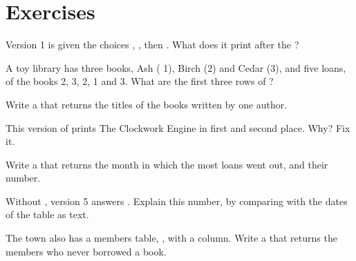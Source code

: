 \section{Exercises}

\begin{exercise}[$\star$]\label{exo:g8:project-data-explorer:1}
Version 1 is given the choices , , then . What does it
print after the ?
\end{exercise}

\begin{exercise}[$\star$]\label{exo:g8:project-data-explorer:2}
A toy library has three books, Ash ( 1), Birch (2) and Cedar
(3), and five loans, of the books 2, 3, 2, 1 and 3. What are the first three
rows of ?
\end{exercise}

\begin{exercise}[$\star$]\label{exo:g8:project-data-explorer:3}
Write a   that returns the titles of
the books written by one author.
\end{exercise}

\begin{exercise}[$\star$]\label{exo:g8:project-data-explorer:4}
This version of  prints The Clockwork Engine in first and second
place. Why? Fix it.

\label{lst:g8:project-data-explorer:top-bug}
\end{exercise}

\begin{exercise}[$\star\star$]\label{exo:g8:project-data-explorer:5}
Write a   that returns the month in which
the most loans went out, and their number.
\end{exercise}

\begin{exercise}[$\star\star$]\label{exo:g8:project-data-explorer:6}
Without , version 5 answers . Explain this number, by comparing  with the
dates of the table as text.
\end{exercise}

\begin{exercise}[$\star\star$]\label{exo:g8:project-data-explorer:7}
The town also has a members table, , with a
 column. Write a   that returns the members who never borrowed a book.
\end{exercise}

